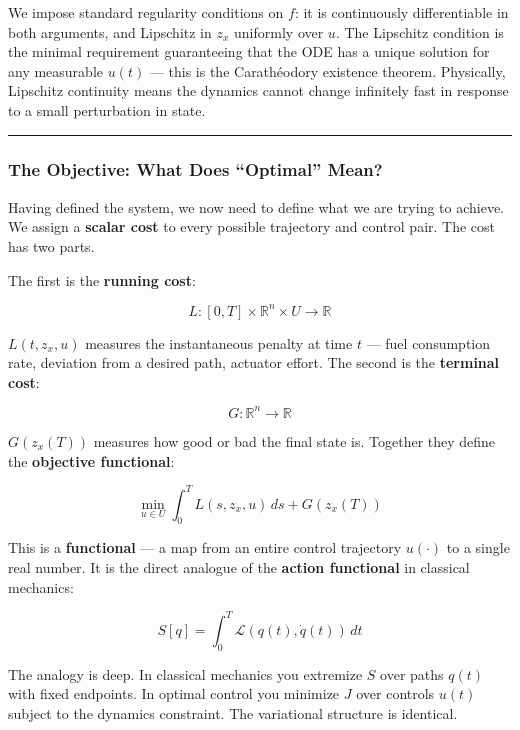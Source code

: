 \documentclass{article}
\begin{document}
\begin{mathrequirementsbox}
We impose standard regularity conditions on $f$: it is continuously differentiable in both arguments, and Lipschitz in $z_x$ uniformly over $u$. The Lipschitz condition is the minimal requirement guaranteeing that the ODE has a unique solution for any measurable $u(t)$ — this is the Carathéodory existence theorem. Physically, Lipschitz continuity means the dynamics cannot change infinitely fast in response to a small perturbation in state.
\end{mathrequirementsbox}

\medskip\hrule\medskip

\subsubsection{The Objective: What Does ``Optimal'' Mean?}

Having defined the system, we now need to define what we are trying to achieve. We assign a \textbf{scalar cost} to every possible trajectory and control pair. The cost has two parts.

The first is the \textbf{running cost}:

$$L : [0,T] \times \mathbb{R}^n \times U \to \mathbb{R}$$

$L(t, z_x, u)$ measures the instantaneous penalty at time $t$ — fuel consumption rate, deviation from a desired path, actuator effort. The second is the \textbf{terminal cost}:

$$G : \mathbb{R}^n \to \mathbb{R}$$

$G(z_x(T))$ measures how good or bad the final state is. Together they define the \textbf{objective functional}:

\begin{equation}
\min_{u \in U} \int_0^T L(s, z_x, u)\, ds + G(z_x(T))
\label{eq:ocp-objective}
\end{equation}

\begin{physicsinsightbox}
This is a \textbf{functional} — a map from an entire control trajectory $u(\cdot)$ to a single real number. It is the direct analogue of the \textbf{action functional} in classical mechanics:

$$S[q] = \int_0^T \mathcal{L}(q(t), \dot{q}(t))\, dt$$

The analogy is deep. In classical mechanics you extremize $S$ over paths $q(t)$ with fixed endpoints. In optimal control you minimize $J$ over controls $u(t)$ subject to the dynamics constraint. The variational structure is identical.
\end{physicsinsightbox}
\end{document}
